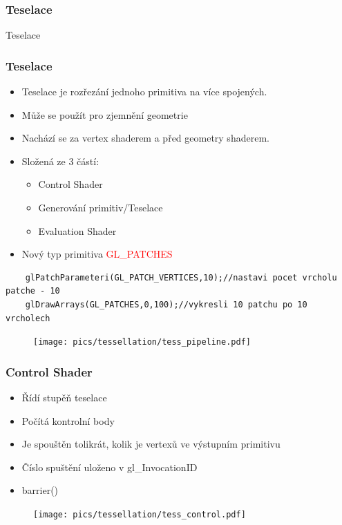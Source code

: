 \begin{frame}
\frametitle{Teselace}
\begin{center}
\Huge {\color{white}Teselace}
\end{center}
\end{frame}

\begin{frame}[fragile]
\frametitle{Teselace}
	\begin{itemize}
	\item Teselace je rozřezání jednoho primitiva na více spojených.
	\item Může se použít pro zjemnění geometrie
	\item Nachází se za vertex shaderem a před geometry shaderem.
	\item Složená ze 3 částí:
	\begin{itemize}
	\item Control Shader
	\item Generování primitiv/Teselace
	\item Evaluation Shader
	\end{itemize}
	\item Nový typ primitiva \textcolor{red}{GL\_PATCHES}
	\end{itemize}
  {\scriptsize
	\begin{verbatim}
    glPatchParameteri(GL_PATCH_VERTICES,10);//nastavi pocet vrcholu patche - 10
    glDrawArrays(GL_PATCHES,0,100);//vykresli 10 patchu po 10 vrcholech
	\end{verbatim}
  }
	\begin{figure}[h]
	\texttt{[image: pics/tessellation/tess\_pipeline.pdf]}
	\end{figure}
\end{frame}

\begin{frame}
\frametitle{Control Shader}
	\begin{itemize}
	\item Řídí stupěň teselace
	\item Počítá kontrolní body
	\item Je spouštěn tolikrát, kolik je vertexů ve výstupním primitivu
	\item Číslo spuštění uloženo v \textcolor{OliveGreen}{gl\_InvocationID}
	\item \textcolor{OliveGreen}{barrier}()
	\end{itemize}
	\begin{figure}[h]
	\texttt{[image: pics/tessellation/tess\_control.pdf]}
	\end{figure}
\end{frame}

